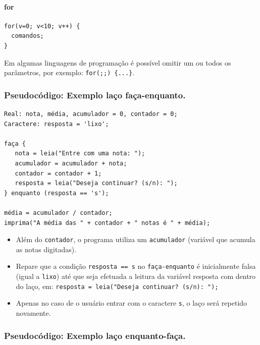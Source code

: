 \documentclass[12pt,a4paper]{article}
\begin{document}
    \hypertarget{for}{%
\paragraph{for}\label{for}}

    \begin{verbatim}
for(v=0; v<10; v++) {
  comandos;
}
\end{verbatim}

Em algumas linguagens de programação é possível omitir um ou todos os
parâmetros, por exemplo: \texttt{for(;;)\ \{...\}}.

    \hypertarget{pseudocuxf3digo-exemplo-lauxe7o-fauxe7a-enquanto.}{%
\subsubsection{Pseudocódigo: Exemplo laço
faça-enquanto.}\label{pseudocuxf3digo-exemplo-lauxe7o-fauxe7a-enquanto.}}

\begin{verbatim}
Real: nota, média, acumulador = 0, contador = 0;
Caractere: resposta = 'lixo';

faça {
   nota = leia("Entre com uma nota: ");
   acumulador = acumulador + nota;
   contador = contador + 1;
   resposta = leia("Deseja continuar? (s/n): ");
} enquanto (resposta == 's');

média = acumulador / contador;
imprima("A média das " + contador + " notas é " + média);
\end{verbatim}

    \begin{itemize}
\item
  Além do \texttt{contador}, o programa utiliza um \texttt{acumulador}
  (variável que acumula as notas digitadas).
\item
  Repare que a condição
  \texttt{resposta\ ==\ \textquotesingle{}s\textquotesingle{}} no
  \texttt{faça-enquanto} é inicialmente falsa (igual a
  \texttt{\textquotesingle{}lixo\textquotesingle{}}) até que seja
  efetuada a leitura da variável resposta com dentro do laço, em:
  \texttt{resposta\ =\ leia("Deseja\ continuar?\ (s/n):\ ");}
\item
  Apenas no caso de o usuário entrar com o caractere
  \texttt{\textquotesingle{}s\textquotesingle{}}, o laço será repetido
  novamente.
\end{itemize}

    \hypertarget{pseudocuxf3digo-exemplo-lauxe7o-enquanto-fauxe7a.}{%
\subsubsection{Pseudocódigo: Exemplo laço
enquanto-faça.}\label{pseudocuxf3digo-exemplo-lauxe7o-enquanto-fauxe7a.}}
\end{document}
